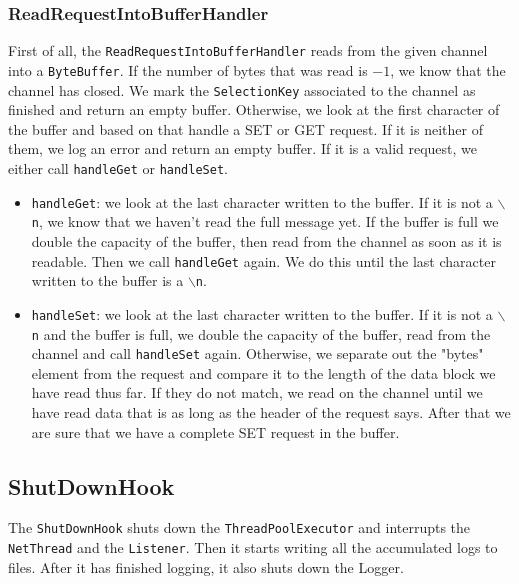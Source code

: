 \documentclass[11pt,a4paper]{article}
\newcommand{\co}[1]{\texttt{#1}}
\begin{document}
\subsubsection{ReadRequestIntoBufferHandler} \label{readrequestLabel}
First of all, the \co{ReadRequestIntoBufferHandler} reads from the given channel into a \co{ByteBuffer}. If the number of bytes that was read is $-1$, we know that the channel has closed. We mark the \co{SelectionKey} associated to the channel as finished and return an empty buffer. Otherwise, we look at the first character of the buffer and based on that handle a SET or GET request. If it is neither of them, we log an error and return an empty buffer. If it is a valid request, we either call \co{handleGet} or \co{handleSet}.
\begin{itemize}
	\item \co{handleGet}: we look at the last character written to the buffer. If it is not a \co{$\backslash$n}, we know that we haven't read the full message yet. If the buffer is full we double the capacity of the buffer, then read from the channel  as soon as it is readable. Then we call \co{handleGet} again. We do this until the last character written to the buffer is a \co{$\backslash$n}.
	\item \co{handleSet}: we look at the last character written to the buffer. If it is not a \co{$\backslash$n} and the buffer is full, we double the capacity of the buffer, read from the channel and call \co{handleSet} again. Otherwise, we separate out the "bytes" element from the request and compare it to the length of the data block we have read thus far. If they do not match, we read on the channel until we have read data that is as long as the header of the request says. After that we are sure that we have a complete SET request in the buffer. 
\end{itemize}

\subsection{ShutDownHook}
The \co{ShutDownHook} shuts down the \co{ThreadPoolExecutor} and interrupts the \co{NetThread} and the \co{Listener}. Then it starts writing all the accumulated logs to files. After it has finished logging, it also shuts down the Logger.
\end{document}
